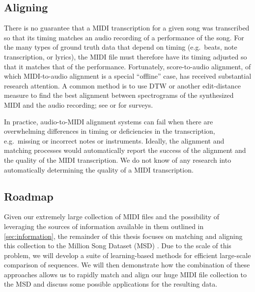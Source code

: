 \subsection{Aligning}

There is no guarantee that a MIDI transcription for a given song was transcribed so that its timing matches an audio recording of a performance of the song.
For the many types of ground truth data that depend on timing (e.g.\ beats, note transcription, or lyrics), the MIDI file must therefore have its timing adjusted so that it matches that of the performance.
Fortunately, score-to-audio alignment, of which MIDI-to-audio alignment is a special ``offline'' case, has received substantial research attention.
A common method is to use DTW or another edit-distance measure to find the best alignment between spectrograms of the synthesized MIDI and the audio recording; see \cite{raffel2016optimizing} or \cite{ewert2012towards} for surveys.

In practice, audio-to-MIDI alignment systems can fail when there are overwhelming differences in timing or deficiencies in the transcription, e.g.\ missing or incorrect notes or instruments.
Ideally, the alignment and matching processes would automatically report the success of the alignment and the quality of the MIDI transcription.
We do not know of any research into automatically determining the quality of a MIDI transcription.

\subsection{Roadmap}

Given our extremely large collection of MIDI files and the possibility of leveraging the sources of information available in them outlined in \cref{sec:information}, the remainder of this thesis focuses on matching and aligning this collection to the Million Song Dataset (MSD) \cite{bertin2011million}.
Due to the scale of this problem, we will develop a suite of learning-based methods for efficient large-scale comparison of sequences.
We will then demonstrate how the combination of these approaches allows us to rapidly match and align our huge MIDI file collection to the MSD and discuss some possible applications for the resulting data.
